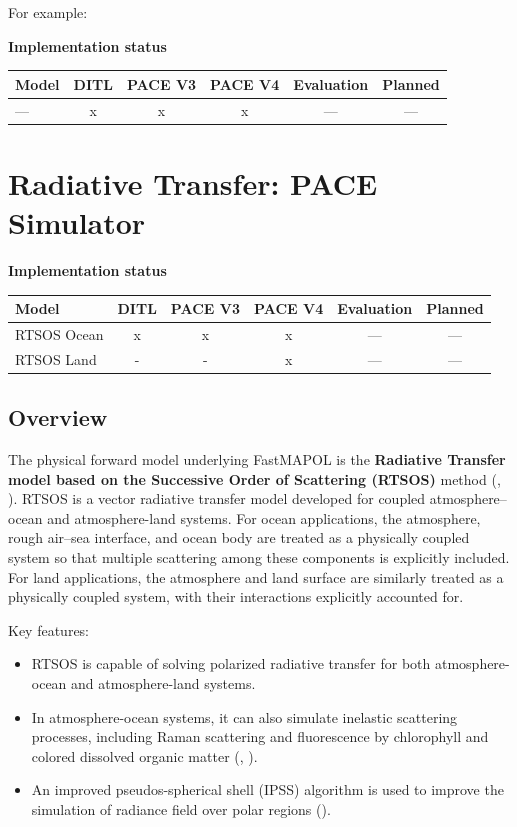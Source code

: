 \documentclass[
  11pt,
  letterpaper,
]{scrreprt}
\providecommand{\tightlist}{%
  \setlength{\itemsep}{0pt}\setlength{\parskip}{0pt}}
\begin{document}
For example:

\textbf{Implementation status}

\begin{longtable}[]{@{}lccccc@{}}
\toprule\noalign{}
Model & DITL & PACE V3 & PACE V4 & Evaluation & Planned \\
\midrule\noalign{}
\endhead
\bottomrule\noalign{}
\endlastfoot
--- & x & x & x & --- & --- \\
\end{longtable}

\chapter{Radiative Transfer: PACE Simulator}\label{sec-rt-model}

\textbf{Implementation status}

\begin{longtable}[]{@{}lccccc@{}}
\toprule\noalign{}
Model & DITL & PACE V3 & PACE V4 & Evaluation & Planned \\
\midrule\noalign{}
\endhead
\bottomrule\noalign{}
\endlastfoot
RTSOS Ocean & x & x & x & --- & --- \\
RTSOS Land & - & - & x & --- & --- \\
\end{longtable}

\section{Overview}\label{overview-2}

The physical forward model underlying FastMAPOL is the \textbf{Radiative
Transfer model based on the Successive Order of Scattering (RTSOS)}
method (,
). RTSOS is a vector radiative transfer
model developed for coupled atmosphere--ocean and atmosphere-land
systems. For ocean applications, the atmosphere, rough air--sea
interface, and ocean body are treated as a physically coupled system so
that multiple scattering among these components is explicitly included.
For land applications, the atmosphere and land surface are similarly
treated as a physically coupled system, with their interactions
explicitly accounted for.

Key features:

\begin{itemize}
\tightlist
\item
  RTSOS is capable of solving polarized radiative transfer for both
  atmosphere-ocean and atmosphere-land systems.
\item
  In atmosphere-ocean systems, it can also simulate inelastic scattering
  processes, including Raman scattering and fluorescence by chlorophyll
  and colored dissolved organic matter (, ).
\item
  An improved pseudos-spherical shell (IPSS) algorithm is used to
  improve the simulation of radiance field over polar regions
  ().
\end{itemize}
\end{document}
